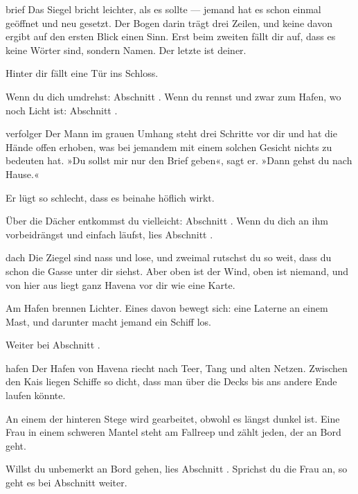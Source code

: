 \begin{soloBlock}{brief}
Das Siegel bricht leichter, als es sollte — jemand hat es schon einmal geöffnet und
neu gesetzt. Der Bogen darin trägt drei Zeilen, und keine davon ergibt auf den ersten
Blick einen Sinn. Erst beim zweiten fällt dir auf, dass es keine Wörter sind, sondern
Namen. Der letzte ist deiner.

Hinter dir fällt eine Tür ins Schloss.

Wenn du dich umdrehst: Abschnitt . Wenn du rennst und zwar
zum Hafen, wo noch Licht ist: Abschnitt .
\end{soloBlock}

\begin{soloBlock}{verfolger}
Der Mann im grauen Umhang steht drei Schritte vor dir und hat die Hände offen
erhoben, was bei jemandem mit einem solchen Gesicht nichts zu bedeuten hat. »Du
sollst mir nur den Brief geben«, sagt er. »Dann gehst du nach Hause.«

Er lügt so schlecht, dass es beinahe höflich wirkt.

Über die Dächer entkommst du vielleicht: Abschnitt . Wenn du dich
an ihm vorbeidrängst und einfach läufst, lies Abschnitt .
\end{soloBlock}

\begin{soloBlock}{dach}
Die Ziegel sind nass und lose, und zweimal rutschst du so weit, dass du schon die
Gasse unter dir siehst. Aber oben ist der Wind, oben ist niemand, und von hier aus
liegt ganz Havena vor dir wie eine Karte.

Am Hafen brennen Lichter. Eines davon bewegt sich: eine Laterne an einem Mast, und
darunter macht jemand ein Schiff los.

Weiter bei Abschnitt .
\end{soloBlock}

\begin{soloBlock}{hafen}
Der Hafen von Havena riecht nach Teer, Tang und alten Netzen. Zwischen den Kais
liegen Schiffe so dicht, dass man über die Decks bis ans andere Ende laufen könnte.

An einem der hinteren Stege wird gearbeitet, obwohl es längst dunkel ist. Eine Frau
in einem schweren Mantel steht am Fallreep und zählt jeden, der an Bord geht.

Willst du unbemerkt an Bord gehen, lies Abschnitt . Sprichst du
die Frau an, so geht es bei Abschnitt  weiter.
\end{soloBlock}

